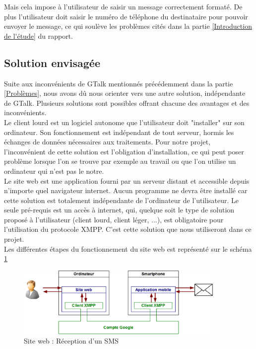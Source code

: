 Mais cela impose à l'utilisateur de saisir un message correctement formaté.
De plus l'utilisateur doit saisir le numéro de téléphone du destinataire pour pouvoir envoyer le message, ce qui soulève les problèmes cités dans la partie \ref{Introduction de l'étude} du rapport.
\\




\subsection{Solution envisagée}

Suite aux inconvénients de GTalk mentionnés précédemment dans la partie \ref{Problèmes}, nous avons dû nous orienter vers une autre solution, indépendante de GTalk.
Plusieurs solutions sont possibles offrant chacune des avantages et des inconvénients.
\\


Le client lourd est un logiciel autonome que l'utilisateur doit "installer" sur son ordinateur.
Son fonctionnement est indépendant de tout serveur, hormis les échanges de données nécessaires aux traitements.
Pour notre projet, l'inconvénient de cette solution est l'obligation d'installation, ce qui peut poser problème lorsque l'on se trouve par exemple au travail ou que l'on utilise un ordinateur qui n'est pas le notre.
\\


Le site web est une application fourni par un serveur distant et accessible depuis n'importe quel navigateur internet.
Aucun programme ne devra être installé car cette solution est totalement indépendante de l'ordinateur de l'utilisateur.
Le seule pré-requis est un accès à internet, qui, quelque soit le type de solution proposé à l'utilisateur (client lourd, client léger, ...), est obligatoire pour l'utilisation du protocole XMPP.
C'est cette solution que nous utiliseront dans ce projet.
\\


Les différentes étapes du fonctionnement du site web est représenté sur le schéma \ref{schemaFonctionnement_siteWeb}
\begin{figure}[!h]
	\center
	\includegraphics[width=0.9\textwidth]{img/schemaFonctionnement_siteWeb.png}
	\caption{Site web : Réception d'un SMS}
	\label{schemaFonctionnement_siteWeb}
\end{figure}
~~\\